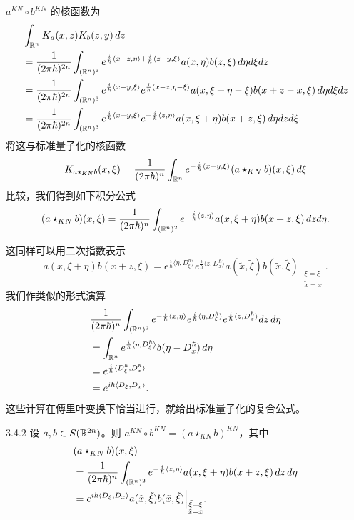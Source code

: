 \(a^{KN}\circ b^{KN}\) 的核函数为
\begin{align*}
  &\int_{\mathbb{R}^n}K_a(x,z)K_b(z,y)\,dz\\
  &=\frac{1}{(2\pi\hbar)^{2n}}\int_{(\mathbb{R}^n)^3}
    e^{\frac{i}{\hbar}\langle x-z,\eta\rangle+\frac{i}{\hbar}\langle z-y,\xi\rangle}
    a(x,\eta)b(z,\xi)\,d\eta d\xi dz\\
  &=\frac{1}{(2\pi\hbar)^{2n}}\int_{(\mathbb{R}^n)^3}
    e^{\frac{i}{\hbar}\langle x-y,\xi\rangle}
    e^{\frac{i}{\hbar}\langle x-z,\eta-\xi\rangle}
    a(x,\xi+\eta-\xi)b(x+z-x,\xi)\,d\eta d\xi dz\\
  &=\frac{1}{(2\pi\hbar)^{2n}}\int_{(\mathbb{R}^n)^3}
    e^{\frac{i}{\hbar}\langle x-y,\xi\rangle}
    e^{-\frac{i}{\hbar}\langle z,\eta\rangle}
    a(x,\xi+\eta)b(x+z,\xi)\,d\eta dz d\xi.
\end{align*}
将这与标准量子化的核函数
\[
  K_{a\star_{KN}b}(x,\xi)
  =\frac{1}{(2\pi\hbar)^{n}}\int_{\mathbb{R}^n}
  e^{-\frac{i}{\hbar}\langle x-y,\xi\rangle}(a\star_{KN}b)(x,\xi)\,d\xi
\]
比较，我们得到如下积分公式
\[
  (a\star_{KN}b)(x,\xi)
  =\frac{1}{(2\pi\hbar)^{n}}\int_{(\mathbb{R}^n)^2}
  e^{-\frac{i}{\hbar}\langle z,\eta\rangle}a(x,\xi+\eta)b(x+z,\xi)\,dz d\eta.
\]

这同样可以用二次指数表示
\[
  a(x,\xi+\eta)b(x+z,\xi)
  =e^{\frac{i}{\hbar}\langle\eta,D_\xi^\hbar\rangle}
  e^{\frac{i}{\hbar}\langle z,D_x^\hbar\rangle}
  a(\tilde x,\tilde\xi)b(\tilde x,\tilde\xi)
  \Big|_{\substack{\tilde\xi=\xi\\ \tilde x=x}}.
\]
我们作类似的形式演算
\begin{align*}
  &\frac{1}{(2\pi\hbar)^{n}}\int_{(\mathbb{R}^n)^2}
    e^{-\frac{i}{\hbar}\langle x,\eta\rangle}
    e^{\frac{i}{\hbar}\langle\eta,D_\xi^\hbar\rangle}
    e^{\frac{i}{\hbar}\langle z,D_x^\hbar\rangle}
    dz\,d\eta\\
  &=\int_{\mathbb{R}^n}
    e^{\frac{i}{\hbar}\langle\eta,D_\xi^\hbar\rangle}
    \delta(\eta-D_x^\hbar)\,d\eta\\
  &=e^{\frac{i}{\hbar}\langle D_\xi^\hbar,D_x^\hbar\rangle}\\
  &=e^{i\hbar\langle D_\xi,D_x\rangle}.
\end{align*}
这些计算在傅里叶变换下恰当进行，就给出标准量子化的复合公式。

\begin{proposition}{3.4.2}
  设 \(a,b\in S(\mathbb{R}^{2n})\)。则 \(a^{KN}\circ b^{KN}=(a\star_{KN}b)^{KN}\)，其中
  \begin{align*}
    &(a\star_{KN}b)(x,\xi)\\
    &=\frac{1}{(2\pi\hbar)^{n}}\int_{(\mathbb{R}^n)^2}
      e^{-\frac{i}{\hbar}\langle z,\eta\rangle}
      a(x,\xi+\eta)b(x+z,\xi)\,dz\,d\eta\\
    &=e^{i\hbar\langle D_\xi,D_x\rangle}
      a(\tilde x,\tilde\xi)b(\tilde x,\tilde\xi)
      \Big|_{\substack{\tilde\xi=\xi\\ \tilde x=x}}.
  \end{align*}
\end{proposition}

